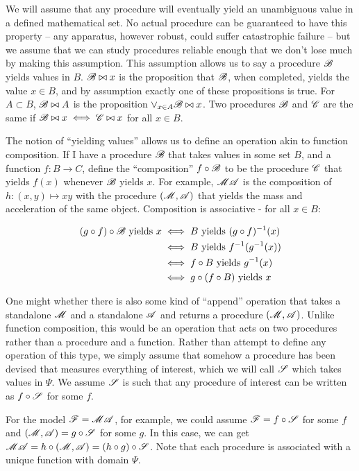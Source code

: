 We will assume that any procedure will eventually yield an unambiguous value in a defined mathematical set. No actual procedure can be guaranteed to have this property -- any apparatus, however robust, could suffer catastrophic failure -- but we assume that we can study procedures reliable enough that we don't lose much by making this assumption. This assumption allows us to say a procedure $\mathscr{B}$ yields values in $B$. $\mathscr{B}\bowtie x$ is the proposition that $\mathscr{B}$, when completed, yields the value $x\in B$, and by assumption exactly one of these propositions is true. For $A\subset B$, $\mathscr{B}\bowtie A$ is the proposition $\lor_{x\in A} \mathscr{B}\bowtie x$. Two procedures $\mathscr{B}$ and $\mathscr{C}$ are the same if $\mathscr{B}\bowtie x\iff \mathscr{C}\bowtie x$ for all $x\in B$. 

The notion of ``yielding values'' allows us to define an operation akin to function composition. If I have a procedure $\mathscr{B}$ that takes values in some set $B$, and a function $f:B\to C$, define the ``composition'' $f\circ \mathscr{B}$ to be the procedure $\mathscr{C}$ that yields $f(x)$ whenever $\mathscr{B}$ yields $x$. For example, $\mathscr{MA}$ is the composition of $h:(x,y)\mapsto xy$ with the procedure $(\mathscr{M},\mathscr{A})$ that yields the mass and acceleration of the same object. Composition is associative - for all $x\in B$: 

\begin{align}
	(g\circ f)\circ\mathscr{B}\text{ yields } x &\iff B\text{ yields } (g\circ f)^{-1}(x) \\
	&\iff B\text{ yields } f^{-1}(g^{-1}(x))\\
	&\iff f\circ B \text{ yields } g^{-1}(x)\\
	&\iff g\circ(f\circ B)\text{ yields } x
\end{align}


One might whether there is also some kind of ``append'' operation that takes a standalone $\mathscr{M}$ and a standalone $\mathscr{A}$ and returns a procedure $(\mathscr{M},\mathscr{A})$. Unlike function composition, this would be an operation that acts on two procedures rather than a procedure and a function. Rather than attempt to define any operation of this type, we simply assume that somehow a procedure has been devised that measures everything of interest, which we will call $\mathscr{S}$ which takes values in $\Psi$. We assume $\mathscr{S}$ is such that any procedure of interest can be written as $f\circ \mathscr{S}$ for some $f$.

For the model $\mathscr{F}=\mathscr{MA}$, for example, we could assume $\mathscr{F}=f\circ \mathscr{S}$ for some $f$ and $(\mathscr{M},\mathscr{A})=g\circ \mathscr{S}$ for some $g$. In this case, we can get $\mathscr{MA}=h\circ(\mathscr{M},\mathscr{A})=(h\circ g)\circ\mathscr{S}$. Note that each procedure is associated with a unique function with domain $\Psi$.

